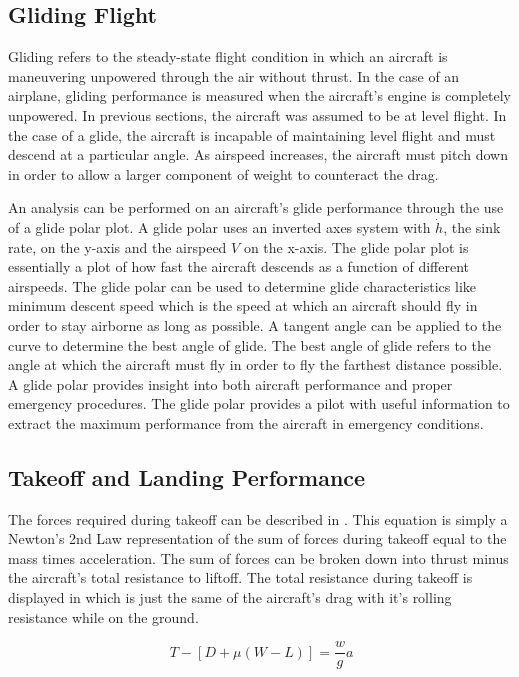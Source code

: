 \documentclass[conf]{new-aiaa}
\begin{document}
\subsection{Gliding Flight}

Gliding refers to the steady-state flight condition in which an aircraft is maneuvering unpowered through the air without thrust. In the case of an airplane, gliding performance is measured when the aircraft's engine is completely unpowered. In previous sections, the aircraft was assumed to be at level flight. In the case of a glide, the aircraft is incapable of maintaining level flight and must descend at a particular angle. As airspeed increases, the aircraft must pitch down in order to allow a larger component of weight to counteract the drag.

An analysis can be performed on an aircraft's glide performance through the use of a glide polar plot. A glide polar uses an inverted axes system with \(\dot{h}\), the sink rate, on the y-axis and the airspeed \(V\) on the x-axis. The glide polar plot is essentially a plot of how fast the aircraft descends as a function of different airspeeds. The glide polar can be used to determine glide characteristics like minimum descent speed which is the speed at which an aircraft should fly in order to stay airborne as long as possible. A tangent angle can be applied to the curve to determine the best angle of glide. The best angle of glide refers to the angle at which the aircraft must fly in order to fly the farthest distance possible. A glide polar provides insight into both aircraft performance and proper emergency procedures. The glide polar provides a pilot with useful information to extract the maximum performance from the aircraft in emergency conditions. 

\subsection{Takeoff and Landing Performance}


The forces required during takeoff can be described in . This equation is simply a Newton's 2nd Law representation of the sum of forces during takeoff equal to the mass times acceleration. The sum of forces can be broken down into thrust minus the aircraft's total resistance to liftoff. The total resistance during takeoff is displayed in  which is just the same of the aircraft's drag with it's rolling resistance while on the ground.

\begin{equation} \label{TO}
\ T - [D + \mu (W-L)] = \dfrac{w}{g}a
\end{equation}
\end{document}
